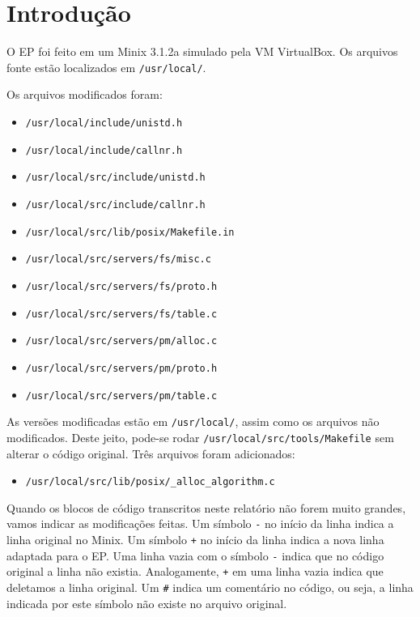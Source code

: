 \documentclass{amsart}
\title[]{\rule{10.5cm}{0.8pt}\\Exercício-Programa 3:\\
Políticas de Alocação
\\\vspace{2mm}\footnotesize
  Sistemas Operacionais --- MAC0422\\\rule{10cm}{0.8pt}}
\author[]{Renato Lui Geh\\NUSP\@: 8536030\\
          Guilherme Freire\\NUSP\@: 7557373}
\theoremstyle{plain}
\newcommand{\code}[1]{\lstinline[mathescape=true]{#1}}
\begin{document}
\date{\today}
\maketitle

\section{Introdução}

O EP foi feito em um Minix 3.1.2a simulado pela VM VirtualBox. Os arquivos fonte estão localizados
em \code{/usr/local/}.

Os arquivos modificados foram:

\begin{itemize}
  \item \code{/usr/local/include/unistd.h}
  \item \code{/usr/local/include/callnr.h}
  \item \code{/usr/local/src/include/unistd.h}
  \item \code{/usr/local/src/include/callnr.h}
  \item \code{/usr/local/src/lib/posix/Makefile.in}
  \item \code{/usr/local/src/servers/fs/misc.c}
  \item \code{/usr/local/src/servers/fs/proto.h}
  \item \code{/usr/local/src/servers/fs/table.c}
  \item \code{/usr/local/src/servers/pm/alloc.c}
  \item \code{/usr/local/src/servers/pm/proto.h}
  \item \code{/usr/local/src/servers/pm/table.c}
\end{itemize}

As versões modificadas estão em \code{/usr/local/}, assim como os arquivos não modificados. Deste
jeito, pode-se rodar \code{/usr/local/src/tools/Makefile} sem alterar o código original. Três
arquivos foram adicionados:

\begin{itemize}
  \item \code{/usr/local/src/lib/posix/_alloc_algorithm.c}
\end{itemize}

Quando os blocos de código transcritos neste relatório não forem muito grandes, vamos indicar as
modificações feitas. Um símbolo \code{-} no início da linha indica a linha original no Minix. Um
símbolo \code{+} no início da linha indica a nova linha adaptada para o EP\@. Uma linha vazia com o
símbolo \code{-} indica que no código original a linha não existia. Analogamente, \code{+} em uma
linha vazia indica que deletamos a linha original. Um \code{#} indica um comentário no código, ou
seja, a linha indicada por este símbolo não existe no arquivo original.
\end{document}
